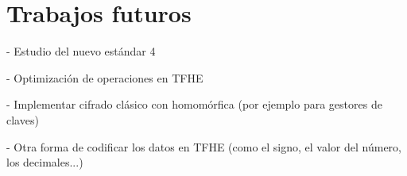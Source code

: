 \chapter{Trabajos futuros}

- Estudio del nuevo estándar 4

- Optimización de operaciones en TFHE

- Implementar cifrado clásico con homomórfica (por ejemplo para gestores de claves)

- Otra forma de codificar los datos en TFHE (como el signo, el valor del número, los decimales...)
